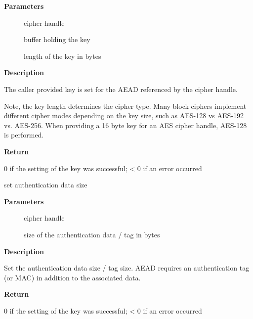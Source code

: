 \documentclass[a4paper,8pt,english]{sphinxmanual}
\begin{document}
\textbf{Parameters}
\begin{description}
\item[{}] \leavevmode
cipher handle

\item[{}] \leavevmode
buffer holding the key

\item[{}] \leavevmode
length of the key in bytes

\end{description}

\textbf{Description}

The caller provided key is set for the AEAD referenced by the cipher
handle.

Note, the key length determines the cipher type. Many block ciphers implement
different cipher modes depending on the key size, such as AES-128 vs AES-192
vs. AES-256. When providing a 16 byte key for an AES cipher handle, AES-128
is performed.

\textbf{Return}

0 if the setting of the key was successful; \textless{} 0 if an error occurred

\begin{fulllineitems}
\label{crypto/api-aead:c.crypto_aead_setauthsize}
set authentication data size

\end{fulllineitems}


\textbf{Parameters}
\begin{description}
\item[{}] \leavevmode
cipher handle

\item[{}] \leavevmode
size of the authentication data / tag in bytes

\end{description}

\textbf{Description}

Set the authentication data size / tag size. AEAD requires an authentication
tag (or MAC) in addition to the associated data.

\textbf{Return}

0 if the setting of the key was successful; \textless{} 0 if an error occurred
\end{document}
